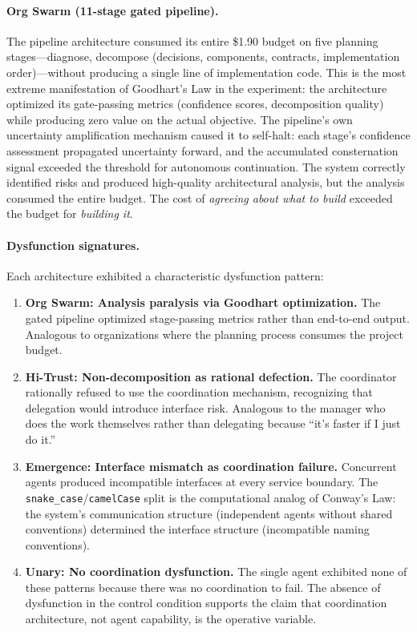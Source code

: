 \documentclass[11pt,a4paper]{article}
\begin{document}
\paragraph{Org Swarm (11-stage gated pipeline).} The pipeline architecture consumed its entire \$1.90 budget on five planning stages---diagnose, decompose (decisions, components, contracts, implementation order)---without producing a single line of implementation code. This is the most extreme manifestation of Goodhart's Law in the experiment: the architecture optimized its gate-passing metrics (confidence scores, decomposition quality) while producing zero value on the actual objective. The pipeline's own uncertainty amplification mechanism caused it to self-halt: each stage's confidence assessment propagated uncertainty forward, and the accumulated consternation signal exceeded the threshold for autonomous continuation. The system correctly identified risks and produced high-quality architectural analysis, but the analysis consumed the entire budget. The cost of \emph{agreeing about what to build} exceeded the budget for \emph{building it}.

\paragraph{Dysfunction signatures.} Each architecture exhibited a characteristic dysfunction pattern:

\begin{enumerate}
\item \textbf{Org Swarm: Analysis paralysis via Goodhart optimization.} The gated pipeline optimized stage-passing metrics rather than end-to-end output. Analogous to organizations where the planning process consumes the project budget.

\item \textbf{Hi-Trust: Non-decomposition as rational defection.} The coordinator rationally refused to use the coordination mechanism, recognizing that delegation would introduce interface risk. Analogous to the manager who does the work themselves rather than delegating because ``it's faster if I just do it.''

\item \textbf{Emergence: Interface mismatch as coordination failure.} Concurrent agents produced incompatible interfaces at every service boundary. The \texttt{snake\_case}/\texttt{camelCase} split is the computational analog of Conway's Law: the system's communication structure (independent agents without shared conventions) determined the interface structure (incompatible naming conventions).

\item \textbf{Unary: No coordination dysfunction.} The single agent exhibited none of these patterns because there was no coordination to fail. The absence of dysfunction in the control condition supports the claim that coordination architecture, not agent capability, is the operative variable.
\end{enumerate}
\end{document}
